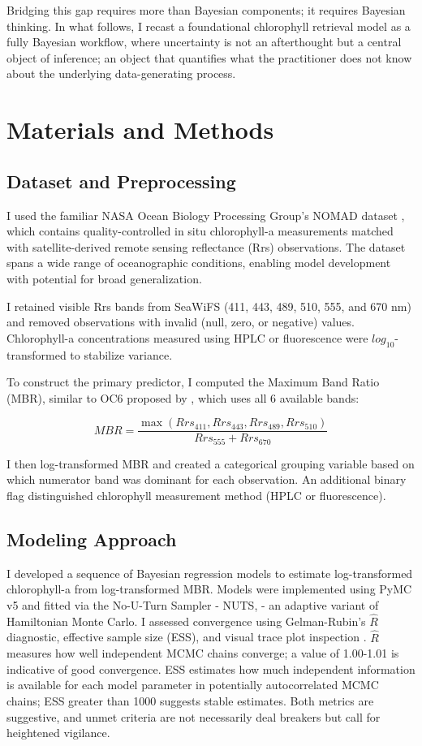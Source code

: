 \documentclass[preprint,authoryear]{elsarticle}
\begin{document}
Bridging this gap requires more than Bayesian components; it requires Bayesian thinking. In what follows, I recast a foundational chlorophyll retrieval model as a fully Bayesian workflow, where uncertainty is not an afterthought but a central object of inference; an object that quantifies what the practitioner does not know about the underlying data-generating process.

\section{Materials and Methods}

\subsection{Dataset and Preprocessing}

I used the familiar NASA Ocean Biology Processing Group's NOMAD dataset \citep{werdell2005improved}, which contains quality-controlled in situ chlorophyll-a measurements matched with satellite-derived remote sensing reflectance (Rrs) observations. The dataset spans a wide range of oceanographic conditions, enabling model development with potential for broad generalization.

I retained visible Rrs bands from SeaWiFS (411, 443, 489, 510, 555, and 670 nm) and removed observations with invalid (null, zero, or negative) values. Chlorophyll-a concentrations measured using HPLC or fluorescence were $log_{10}$-transformed to stabilize variance.

To construct the primary predictor, I computed the Maximum Band Ratio (MBR), similar to OC6 proposed by \cite{oreilly2019}, which uses all 6 available bands:

$$
MBR = \frac{\max(Rrs_{411}, Rrs_{443}, Rrs_{489}, Rrs_{510})}{Rrs_{555} + Rrs_{670}}
$$

I then log-transformed MBR and created a categorical grouping variable based on which numerator band was dominant for each observation. An additional binary flag distinguished chlorophyll measurement method (HPLC or fluorescence).

\subsection{Modeling Approach}

I developed a sequence of Bayesian regression models to estimate log-transformed chlorophyll-a from log-transformed MBR. Models were implemented using PyMC v5 \citep{abril2023pymc} and fitted via the No-U-Turn Sampler - NUTS, \citep{homan2014} - an adaptive variant of Hamiltonian Monte Carlo. I assessed convergence using Gelman-Rubin's $\hat{R}$ diagnostic, effective sample size (ESS), and visual trace plot inspection \cite{mcelreath2020}.
$\hat{R}$ measures how well independent MCMC chains converge; a value of 1.00-1.01 is indicative of good convergence. ESS estimates how much independent information is available for each model parameter in potentially autocorrelated MCMC chains; ESS greater than 1000 suggests stable estimates. Both metrics are suggestive, and unmet criteria are not necessarily deal breakers but call for heightened vigilance.
\end{document}
